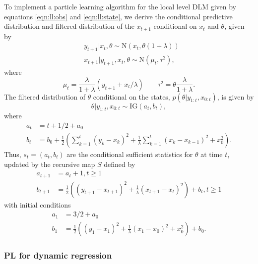 To implement a particle learning algorithm for the local level DLM given by equations \eqref{eqn:ll:obs} and \eqref{eqn:ll:state}, we derive the conditional predictive distribution and filtered distribution of the $x_{t+1}$ conditional on $x_t$ and $\theta$, given by
\begin{align}
&y_{t+1}|x_t,\theta \sim \mbox{N}\left(x_t,\theta(1+\lambda)\right) \label{eqn:pl:ll:pred} \\
&x_{t+1}|y_{t+1},x_t,\theta \sim \mbox{N}(\mu_t,\tau^2) \label{eqn:pl:ll:state},
\end{align}
where \[\mu_t = \frac{\lambda}{1+\lambda}(y_{t+1} + x_t / \lambda) \qquad \tau^2 = \theta\frac{\lambda}{1+\lambda}.\]
The filtered distribution of $\theta$ conditional on the states, $p(\theta|y_{1:t},x_{0:t})$, is given by
\begin{equation}
\theta|y_{1:t},x_{0:t} \sim \mbox{IG}(a_t,b_t),
\end{equation}
where
\begin{align*}
a_t &= t + 1/2 + a_0 \\
b_t &= b_0 + \frac{1}{2}\left(\sum_{k=1}^t (y_k - x_k)^2 + \frac{1}{\lambda}\sum_{k=1}^t (x_k - x_{k-1})^2 + x_0^2\right).
\end{align*}
Thus, $s_t = (a_t,b_t)$ are the conditional sufficient statistics for $\theta$ at time $t$, updated by the recursive map $S$ defined by
\begin{align}
a_{t+1} &= a_t + 1, t \ge 1 \label{eqn:pl:ll:a} \\
b_{t+1} &= \frac{1}{2}\left((y_{t+1}-x_{t+1})^2 + \frac{1}{\lambda}(x_{t+1}-x_t)^2\right) + b_t, t \ge 1 \label{eqn:pl:ll:b}
\end{align}
with initial conditions
\begin{align*}
a_1 &= 3/2 + a_0 \\
b_1 &= \frac{1}{2}\left((y_1-x_1)^2 + \frac{1}{\lambda}(x_1-x_0)^2 + x_0^2\right) + b_0.
\end{align*}

\subsubsection{PL for dynamic regression \label{sec:pl:dr}}

